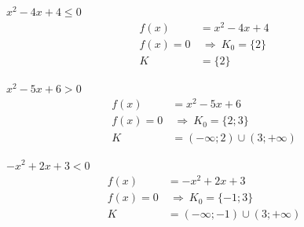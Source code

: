 \documentclass[11pt,a4paper]{article}
\begin{document}
\begin{prikladReseniBox}[title={Příklad 3}]
$x^{2} - 4x + 4\le0$
\tcblower
\[
\begin{aligned}
f(x)&=x^{2} - 4x + 4\\[2pt]
f(x)=0&\ \Rightarrow\ K_0=\{2\}\\[2pt]
K&=\{2\}
\end{aligned}
\]
\end{prikladReseniBox}
\begin{zadaniReseniBox}[title={Samostatná práce 1}]
$x^{2} - 5x + 6>0$
\tcblower
\[
\begin{aligned}
f(x)&=x^{2} - 5x + 6\\[2pt]
f(x)=0&\ \Rightarrow\ K_0=\{2;3\}\\[2pt]
K&=(-\infty;2)\cup(3;+\infty)
\end{aligned}
\]
\end{zadaniReseniBox}
\begin{zadaniReseniBox}[title={Samostatná práce 2}]
$- x^{2} + 2x + 3<0$
\tcblower
\[
\begin{aligned}
f(x)&=- x^{2} + 2x + 3\\[2pt]
f(x)=0&\ \Rightarrow\ K_0=\{-1;3\}\\[2pt]
K&=(-\infty;-1)\cup(3;+\infty)
\end{aligned}
\]
\end{zadaniReseniBox}
\end{document}
